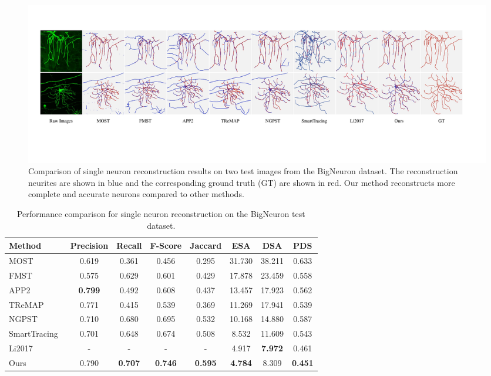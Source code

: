 \begin{figure}[th]
	\centering
	\includegraphics[width=1\textwidth]{./Illustrations/BigNeuron6.pdf}
	\caption{Comparison of single neuron reconstruction results on two test images from the BigNeuron dataset.
	The reconstruction neurites are shown in blue and the corresponding ground truth (GT) are shown in red.
	Our method reconstructs more complete and accurate neurons compared to other methods.
	}
	\label{fig:compare_BigNeuron}
\end{figure}

\begin{table}[th]
	\centering
	\makeatletter{}\makeatother
	\caption{Performance comparison for single neuron reconstruction on the BigNeuron test dataset.}
	\label{table:compare_BigNeuron}
	\begin{tabular}{lccccccc}
		\toprule
		Method & Precision & Recall & F-Score & Jaccard & ESA & DSA & PDS\\
		\midrule
		MOST~\cite{Wu2014} & 0.619 & 0.361 & 0.456 & 0.295 & 31.730 & 38.211 & 0.633\\
		FMST~\cite{Yang2018} & 0.575 & 0.629 & 0.601 & 0.429 & 17.878 & 23.459 & 0.558\\
		APP2~\cite{Xiao2013} & \textbf{0.799} & 0.492 & 0.608 & 0.437 & 13.457 & 17.923 & 0.562\\
		TReMAP~\cite{Zhou2016} & 0.771 & 0.415 & 0.539 & 0.369 & 11.269 & 17.941 & 0.539\\
		NGPST~\cite{Quan2015} & 0.710 & 0.680 & 0.695 & 0.532 & 10.168 & 14.880 & 0.587\\
		SmartTracing~\cite{Chen2015} & 0.701 & 0.648 & 0.674 & 0.508 & 8.532 & 11.609 & 0.543\\
		Li2017~\cite{Li2017} & - & - & - & - & 4.917 & \textbf{7.972} &0.461 \\
		\midrule
		Ours & 0.790 & \textbf{0.707} & \textbf{0.746}  & \textbf{0.595} & \textbf{4.784} & 8.309 & \textbf{0.451}\\
		\bottomrule
	\end{tabular}
\end{table}

